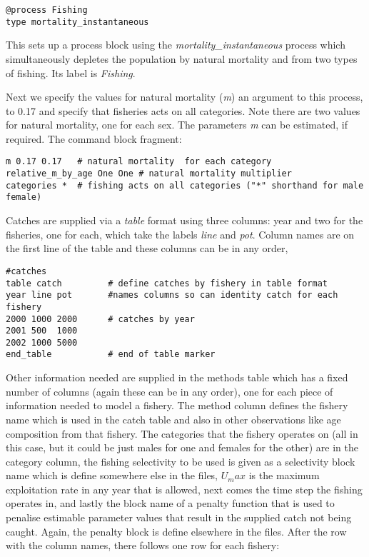 {\small{\begin{verbatim}
@process Fishing
type mortality_instantaneous
\end{verbatim}}}

This sets up a process block using the \textit{mortality\_instantaneous} process which simultaneously depletes the population by natural mortality and from two types of fishing. Its label is \textit{Fishing}.

Next we specify the values for natural mortality (\textit{m}) an argument to this process, to 0.17 and specify that fisheries acts on all categories. Note there are two values for natural mortality, one for each sex. The parameters \textit{m} can be estimated, if required. The command block fragment:

{\small{\begin{verbatim}
m 0.17 0.17   # natural mortality  for each category
relative_m_by_age One One # natural mortality multiplier
categories *  # fishing acts on all categories ("*" shorthand for male female)
\end{verbatim}}}

Catches are supplied via a \textit{table} format using three columns: year and two for the fisheries, one for each, which take the labels \textit{line} and \textit{pot}. Column names are on the first line of the table and these columns can be in any order,

{\small{\begin{verbatim}
#catches
table catch         # define catches by fishery in table format
year line pot       #names columns so can identity catch for each fishery
2000 1000 2000      # catches by year
2001 500  1000
2002 1000 5000
end_table           # end of table marker
\end{verbatim}}}

Other information needed are supplied in the methods table which has a fixed number of columns (again these can be in any order), one for each piece of information needed to model a fishery. The method column defines the fishery name which is used in the catch table and also in other observations like age composition from that fishery. The categories that the fishery operates on (all in this case, but it could be just males for one and females for the other) are in the category column, the fishing selectivity to be used is given as a selectivity block name which is define somewhere else in the files, $U_max$ is the maximum exploitation rate in any year that is allowed, next comes the time step the fishing operates in, and lastly the block name of a penalty function that is used to penalise estimable parameter values that result in the supplied catch not being caught. Again, the penalty block is define elsewhere in the files. After the row with the column names, there follows one row for each fishery:

